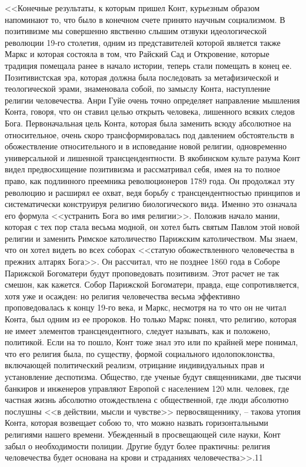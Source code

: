 \documentclass{book}
\begin{document}
<<Конечные результаты, к которым пришел Конт, курьезным образом напоминают то, что было в конечном счете принято научным социализмом. В позитивизме мы совершенно явственно слышим отзвуки идеологической революции 19‑го столетия, одним из представителей которой является также Маркс и которая состояла в том, что Райский Сад и Откровение, которые традиция помещала ранее в начало истории, теперь стали помещать в конец ее. Позитивистская эра, которая должна была последовать за метафизической и теологической эрами, знаменовала собой, по замыслу Конта, наступление религии человечества. Анри Гуйе очень точно определяет направление мышления Конта, говоря, что он ставил целью открыть человека, лишенного всяких следов Бога. Первоначальная цель Конта, которая была заменить всюду абсолютное на относительное, очень скоро трансформировалась под давлением обстоятельств в обожествление относительного и в исповедание новой религии, одновременно универсальной и лишенной трансцендентности. В якобинском культе разума Конт видел предвосхищение позитивизма и рассматривал себя, имея на то полное право, как подлинного преемника революционеров 1789 года. Он продолжал эту революцию и расширял ее охват, ведя борьбу с трансцендентностью принципов и систематически конструируя религию биологического вида. Именно это означала его формула <<устранить Бога во имя религии>>. Положив начало мании, которая с тех пор стала весьма модной, он хотел быть святым Павлом этой новой религии и заменить Римское католичество Парижским католичеством. Мы знаем, что он хотел видеть во всех соборах <<статую обожествленного человечества в прежних алтарях Бога>>. Он рассчитал, что не позднее 1860 года в Соборе Парижской Богоматери будут проповедовать позитивизм. Этот расчет не так смешон, как кажется. Собор Парижской Богоматери, правда, еще сопротивляется, хотя уже и осажден: но рели­гия человечества весьма эффективно проповедовалась к концу 19‑го века, и Маркс, несмотря на то что он не читал Конта, был одним из ее пророков. Но только Маркс понял, что рели­гию, которая не имеет элементов трансцендентного, следует называть, как и положено, политикой. Если на то пошло, Конт тоже знал это или по крайней мере понимал, что его религия была, по существу, формой социального идолопоклонства, включающей политический реализм, отрицание индивидуальных прав и установление деспотизма. Общество, где ученые будут священниками, две тысячи банкиров и инженеров управ­ляют Европой с населением 120 млн. человек, где частная жизнь абсолютно отождествлена с общественной, где люди абсолютно послушны <<в действии, мысли и чувстве>> первосвященнику, -- такова утопия Конта, которая возвещает собою то, что можно назвать горизонтальными религиями нашего времени. Убежденный в просвещающей силе науки, Конт забыл о необходи­мости полиции. Другие будут более практичны: религия человечества будет основана на крови и страданиях человечества>>.11
\end{document}

